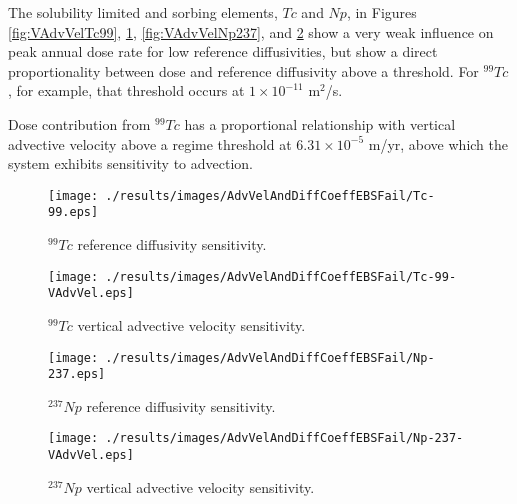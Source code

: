 The solubility limited and sorbing elements, $Tc$ and $Np$, in Figures
\ref{fig:VAdvVelTc99}, \ref{fig:VAdvVelTc99VAdvVel}, \ref{fig:VAdvVelNp237}, and
\ref{fig:VAdvVelNp237VAdvVel} show a very weak influence on peak annual dose
rate for low reference diffusivities, but show a direct proportionality between
dose and reference diffusivity above a threshold. For $^{99}Tc$, for example,
that threshold occurs at $1\times10^{-11}$ m$^2$/s.


Dose contribution from $^{99}Tc$ has a proportional
relationship with vertical advective velocity above a regime threshold at
$6.31\times10^{-5}$ m/yr, above which the system exhibits sensitivity to
advection.


\begin{figure}[htp!]
\begin{minipage}[b]{0.45\linewidth}
\texttt{[image: ./results/images/AdvVelAndDiffCoeffEBSFail/Tc-99.eps]}
\caption{$^{99}Tc$ reference diffusivity sensitivity.}
\label{fig:VAdvVelTc99}

\end{minipage}
\hspace{0.05\linewidth}
\begin{minipage}[b]{0.45\linewidth}

\texttt{[image: ./results/images/AdvVelAndDiffCoeffEBSFail/Tc-99-VAdvVel.eps]}
\caption{$^{99}Tc$ vertical advective velocity sensitivity.}
\label{fig:VAdvVelTc99VAdvVel}

\end{minipage}
\end{figure}

\begin{figure}[htp!]
\begin{minipage}[b]{0.45\linewidth}
\texttt{[image: ./results/images/AdvVelAndDiffCoeffEBSFail/Np-237.eps]}
\caption{$^{237}Np$ reference diffusivity sensitivity.}
\label{fig:VAdvVelNp237}

\end{minipage}
\hspace{0.05\linewidth}
\begin{minipage}[b]{0.45\linewidth}

\texttt{[image: ./results/images/AdvVelAndDiffCoeffEBSFail/Np-237-VAdvVel.eps]}
\caption{$^{237}Np$ vertical advective velocity sensitivity.}
\label{fig:VAdvVelNp237VAdvVel}

\end{minipage}
\end{figure}


